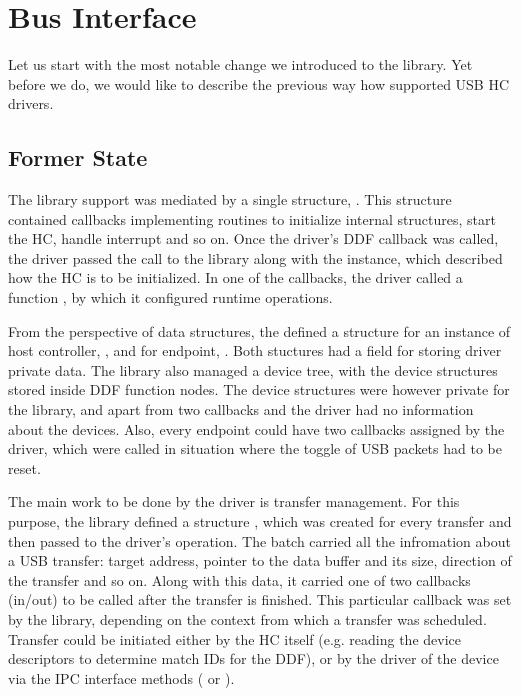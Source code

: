 \section{Bus Interface}

Let us start with the most notable change we introduced to the 
library. Yet before we do, we would like to describe the previous way how
 supported USB HC drivers.

\subsection{Former State}

The library support was mediated by a single structure,
. This structure contained callbacks implementing
routines to initialize internal structures, start the HC, handle interrupt and
so on. Once the driver's DDF callback  was called, the driver
passed the call to the library along with the 
instance, which described how the HC is to be initialized. In one of the
callbacks, the driver called a function , by which
it configured runtime operations.

From the perspective of data structures, the  defined
a structure for an instance of host controller, , and for
endpoint, . Both stuctures had a field for storing driver
private data. The library also managed a device tree, with the device
structures stored inside DDF function nodes. The device structures were however
private for the library, and apart from two callbacks  and
 the driver had no information about the devices. Also,
every endpoint could have two callbacks assigned by the driver, which were
called in situation where the toggle of USB packets had to be reset.

The main work to be done by the driver is transfer management. For this
purpose, the library defined a structure , which
was created for every transfer and then passed to the driver's 
operation. The batch carried all the infromation about a USB transfer: target
address, pointer to the data buffer and its size, direction of the transfer and
so on. Along with this data, it carried one of two callbacks (in/out) to be
called after the transfer is finished. This particular callback was set by the
library, depending on the context from which a transfer was scheduled. Transfer
could be initiated either by the HC itself (e.g. reading the device descriptors
to determine match IDs for the DDF), or by the driver of the device via the IPC
interface methods ( or ).

